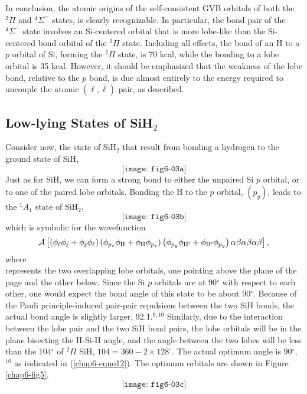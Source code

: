In conclusion, the atomic origins of the self-consistent GVB
orbitals of both the ${^2\Pi}$ and ${^4\Sigma}^-$ 
states, is clearly recognizable.  In particular, the bond pair of 
the ${^4\Sigma}^-$ state involves an Si-centered orbital that is more 
lobe-like than the Si-centered bond orbital of the ${^2\Pi}$ state.  
Including all effects, the bond of an H to a $p$ orbital of Si, 
forming the ${^2\Pi}$ state, is 70 kcal, while the bonding to a 
lobe orbital is 35 kcal.  However, it should be emphasized that the 
weakness of the lobe bond, relative to the $p$ bond, is due almost 
entirely to the energy required to uncouple the atomic $(\ell , 
{\bar{\ell}})$ pair, as described.

\subsection{Low-lying States of SiH$_2$}

Consider now, the state of SiH$_2$ that result from bonding a hydrogen 
to the ground state of SiH,
\begin{equation}
\texttt{[image: fig6-03a]}
\label{chap6-eqno11}
\end{equation}
Just as for SiH, we can form a strong bond to either the unpaired Si 
$p$ orbital, or to one of the paired lobe orbitals.  Bonding the H to 
the $p$ orbital, $(p_y)$, leads to the ${^1A}_1$ state of SiH$_2$,
\begin{equation}
\texttt{[image: fig6-03b]}
\label{chap6-eqno12}
\end{equation}
which is symbolic for the wavefunction
\begin{equation}
{\cal A} \left[ \left( \phi_{\ell} \phi_{\bar{\ell}} +
\phi_{\bar{\ell}} \phi_{\ell} \right) \left( \phi_{p_z}
\phi_\mathrm{H} + \phi_\mathrm{H} \phi_{p_z} \right) \left( \phi_{p_y}
\phi_{\mathrm{H}^{\prime}} + \phi_{\mathrm{H}^{\prime}} \phi_{p_y}
\right) \alpha \beta \alpha \beta \alpha \beta \right] ,
\end{equation}
where
\begin{equation}
\end{equation}
represents the two overlapping lobe orbitals, one pointing above the
plane of the page and the other below.  Since the Si $p$ orbitals are
at 90$^{\circ}$ with respect to each other, one would expect the bond
angle of this state to be about 90$^{\circ}$.  Because of the Pauli
principle-induced pair-pair repulsions between the two SiH bonds, the
actual bond angle is slightly larger, 92.1.$^{9,10}$ Similarly, due to
the interaction between the lobe pair and the two SiH bond pairs, the
lobe orbitals will be in the plane bisecting the H-Si-H angle, and the
angle between the two lobes will be less than the 104$^{\circ}$ of
${^2\Pi}$ SiH, $104 = 360 - 2 \times 128^{\circ}$.  The actual optimum
angle is 90$^{\circ}$,$^{10}$ as indicated in (\ref{chap6-eqno12}).
The optimum orbitals are shown in Figure \ref{chap6-fig5}.
\begin{equation}
\texttt{[image: fig6-03c]}
\label{chap6-eqno12-a}
\end{equation}

